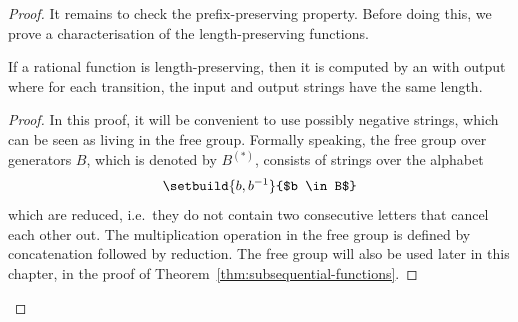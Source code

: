 \begin{proof}
    It remains to check the prefix-preserving property. Before doing this, we prove a characterisation of the length-preserving functions.
    \begin{lemma}\label{lem:characterisation-length-preserving}
        If a rational function is length-preserving, then it is computed by an \nfa with output where for each transition, the input and output strings have the same length.
    \end{lemma}
    \begin{proof}
        In this proof, it will be convenient to use possibly negative strings, which can be seen as living in the free group. Formally speaking, the free group over generators $B$, which is denoted by $B^{(*)}$, consists of strings over the alphabet \begin{align*}\setbuild{ b, b^{-1}}{$b \in B$}\end{align*} which are reduced, i.e.~they do not contain two consecutive letters that cancel each other out. The multiplication operation in the free group is defined by concatenation followed by reduction. The free group will also be used later in this chapter, in the proof of Theorem~\ref{thm:subsequential-functions}.


\end{proof}
\end{proof}
